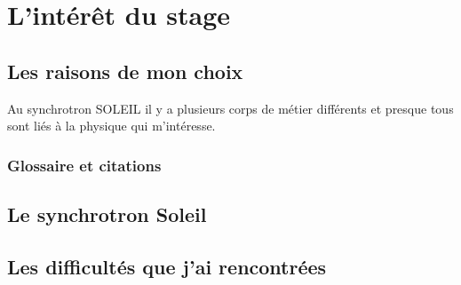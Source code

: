 \chapter{L'intérêt du stage}
	
	\minitoc
	





\section{Les raisons de mon choix}
    Au synchrotron SOLEIL il y a plusieurs corps de métier différents et presque tous sont liés à la physique qui m'intéresse.
	\subsection{Glossaire et citations}
        
	

\section{Le synchrotron Soleil}
\blindtext
\section{Les difficultés que j'ai rencontrées}
\blindtext
\section{}


